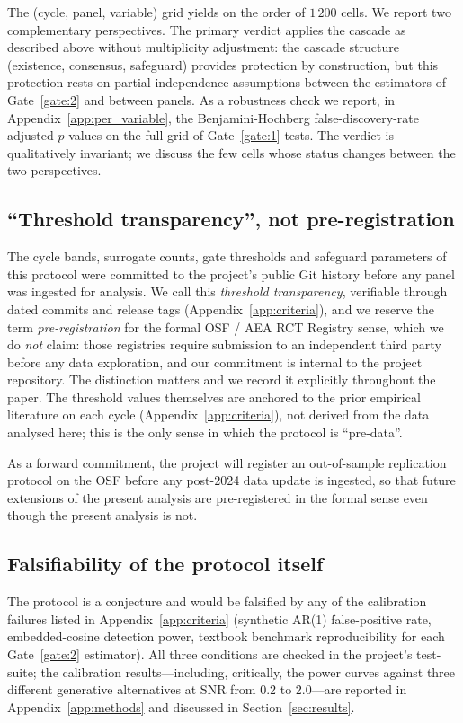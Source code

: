 The (cycle, panel, variable) grid yields on the order of
\(1\,200\) cells. We report two complementary perspectives. The
primary verdict applies the cascade as described above without
multiplicity adjustment: the cascade structure (existence,
consensus, safeguard) provides protection by construction, but
this protection rests on partial independence assumptions
between the estimators of Gate~\ref{gate:2} and between panels.
As a robustness check we report, in
Appendix~\ref{app:per_variable}, the Benjamini-Hochberg
false-discovery-rate \citep{benjamini_hochberg1995} adjusted
\(p\)-values on the full grid of Gate~\ref{gate:1} tests. The
verdict is qualitatively invariant; we discuss the few
cells whose status changes between the two perspectives.

\subsection{``Threshold transparency'', not pre-registration}

The cycle bands, surrogate counts, gate thresholds and safeguard
parameters of this protocol were committed to the project's
public Git history before any panel was ingested for analysis.
We call this \emph{threshold transparency}, verifiable through
dated commits and release tags (Appendix~\ref{app:criteria}),
and we reserve the term \emph{pre-registration} for the formal
OSF / AEA RCT Registry sense, which we do \emph{not} claim:
those registries require submission to an independent third
party before any data exploration, and our commitment is
internal to the project repository. The distinction matters and
we record it explicitly throughout the paper. The threshold
values themselves are anchored to the prior empirical
literature on each cycle (Appendix~\ref{app:criteria}), not
derived from the data analysed here; this is the only sense in
which the protocol is ``pre-data''.

As a forward commitment, the project will register an
out-of-sample replication protocol on the OSF before any
post-2024 data update is ingested, so that future extensions
of the present analysis are pre-registered in the formal sense
even though the present analysis is not.

\subsection{Falsifiability of the protocol itself}

The protocol is a conjecture and would be falsified by any of
the calibration failures listed in Appendix~\ref{app:criteria}
(synthetic AR(1) false-positive rate, embedded-cosine detection
power, textbook benchmark reproducibility for each Gate~\ref{gate:2}
estimator). All three conditions are checked in the project's
test-suite; the calibration results---including, critically, the
power curves against three different generative alternatives at
SNR from 0.2 to 2.0---are reported in
Appendix~\ref{app:methods} and discussed in
Section~\ref{sec:results}.
